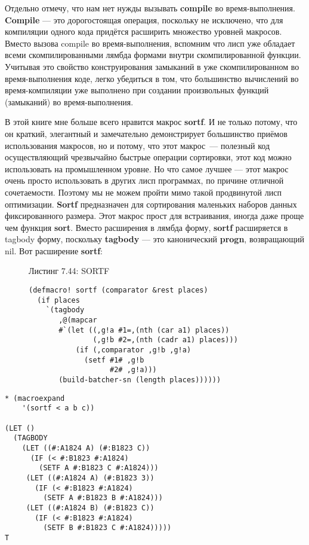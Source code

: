 Отдельно отмечу, что нам нет нужды вызывать \textbf{compile} во время-выполнения. \textbf{Compile} --- это дорогостоящая операция, поскольку не исключено, что для компиляции одного кода придётся расширить множество уровней макросов. Вместо вызова compile во время-выполнения, вспомним что лисп уже обладает всеми скомпилированными лямбда формами внутри скомпилированной функции. Учитывая это свойство конструирования замыканий в уже скомпилированном во время-выполнения коде, легко убедиться в том, что большинство вычислений во время-компиляции уже выполнено при создании произвольных функций (замыканий) во время-выполнения.

В этой книге мне больше всего нравится макрос \textbf{sortf}. И не только потому, что он краткий, элегантный и замечательно демонстрирует большинство приёмов использования макросов, но и потому, что этот макрос~--- полезный код осуществляющий чрезвычайно быстрые операции сортировки, этот код можно использовать на промышленном уровне. Но что самое лучшее --- этот макрос очень просто использовать в других лисп программах, по причине отличной сочетаемости. Поэтому мы не можем пройти мимо такой продвинутой лисп оптимизации. \textbf{Sortf} предназначен для сортирования маленьких наборов данных фиксированного размера. Этот макрос прост для встраивания, иногда даже проще чем функция \textbf{sort}. Вместо расширения в лямбда форму, \textbf{sortf} расширяется в tagbody форму, поскольку \textbf{tagbody} --- это канонический \textbf{progn}, возвращающий nil. Вот расширение \textbf{sortf}:

\begin{figure}Листинг 7.44: SORTF\label{listing_7.44}
\listbegin
\begin{verbatim}
(defmacro! sortf (comparator &rest places)
  (if places
    `(tagbody
       ,@(mapcar
       #`(let ((,g!a #1=,(nth (car a1) places))
               (,g!b #2=,(nth (cadr a1) places)))
           (if (,comparator ,g!b ,g!a)
             (setf #1# ,g!b
                   #2# ,g!a)))
       (build-batcher-sn (length places))))))
\end{verbatim}
\listend
\end{figure}

\begin{verbatim}
* (macroexpand
    '(sortf < a b c))

(LET ()
  (TAGBODY
    (LET ((#:A1824 A) (#:B1823 C))
      (IF (< #:B1823 #:A1824)
        (SETF A #:B1823 C #:A1824)))
     (LET ((#:A1824 A) (#:B1823 3))
       (IF (< #:B1823 #:A1824)
         (SETF A #:B1823 B #:A1824)))
     (LET ((#:A1824 B) (#:B1823 C))
       (IF (< #:B1823 #:A1824)
         (SETF B #:B1823 C #:A1824)))))
T
\end{verbatim}

